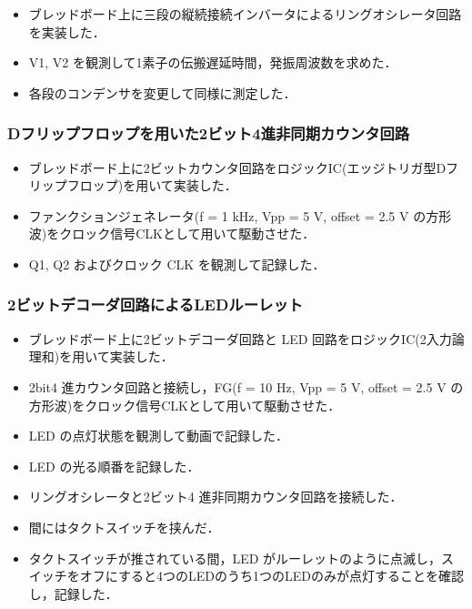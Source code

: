 \documentclass{ltjsarticle}
\begin{document}
\begin{itemize}
  \item ブレッドボード上に三段の縦続接続インバータによるリングオシレータ回路を実装した．
  \item V1, V2 を観測して1素子の伝搬遅延時間，発振周波数を求めた．
  \item 各段のコンデンサを変更して同様に測定した．
\end{itemize}

\subsubsection{Dフリップフロップを用いた2ビット4進非同期カウンタ回路}
\begin{itemize}
  \item ブレッドボード上に2ビットカウンタ回路をロジックIC(エッジトリガ型Dフリップフロップ)を用いて実装した．
  \item ファンクションジェネレータ(f = 1 kHz, Vpp = 5 V, offset = 2.5 V の方形波)をクロック信号CLKとして用いて駆動させた．
  \item Q1, Q2 およびクロック CLK を観測して記録した．
\end{itemize}

\subsubsection{2ビットデコーダ回路によるLEDルーレット}
\begin{itemize}
  \item ブレッドボード上に2ビットデコーダ回路と LED 回路をロジックIC(2入力論理和)を用いて実装した．
  \item 2bit4 進カウンタ回路と接続し，FG(f = 10 Hz, Vpp = 5 V, offset = 2.5 V の方形波)をクロック信号CLKとして用いて駆動させた．
  \item LED の点灯状態を観測して動画で記録した．
  \item LED の光る順番を記録した．
\end{itemize}

\begin{itemize}
  \item リングオシレータと2ビット4 進非同期カウンタ回路を接続した．
  \item 間にはタクトスイッチを挟んだ．
  \item タクトスイッチが推されている間，LED がルーレットのように点滅し，スイッチをオフにすると4つのLEDのうち1つのLEDのみが点灯することを確認し，記録した．
\end{itemize}
\end{document}

